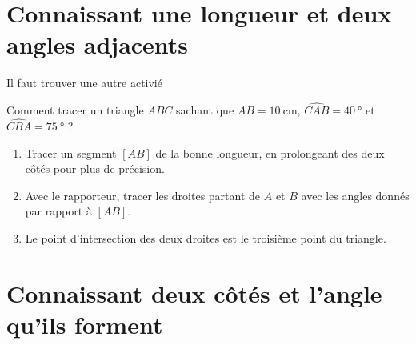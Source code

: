 \section{Connaissant une longueur et deux angles adjacents}

\large{Il faut trouver une autre activié}


Comment tracer un triangle \( ABC\) sachant que \( AB=\SI{10}{\centi\meter}\), \( \widehat{CAB}=\SI{40}{\degree}\) et \( \widehat{CBA}=\SI{75}{\degree}\) ?



\begin{enumerate}
    \item
        Tracer un segment $[AB]$ de la bonne longueur, en prolongeant des deux côtés pour plus de précision.

\begin{center}
   
\end{center}
\item
    Avec le rapporteur, tracer les droites partant de \( A\) et \( B\) avec les angles donnés par rapport à \( [AB] \).

\begin{center}
   
\end{center}

\item

    Le point d'intersection des deux droites est le troisième point du triangle.

\begin{center}
   
\end{center}

\end{enumerate}

\section{Connaissant deux côtés et l'angle qu'ils forment}

